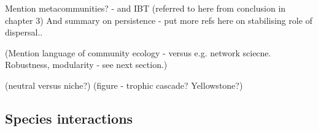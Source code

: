 Mention metacommunities? - and IBT (referred to here from conclusion in chapter 3) And summary on persistence - put more refs here on stabilising role of dispersal..

(Mention language of community ecology - versus e.g. network sciecne. Robustness, modularity - see next section.)

(neutral versus niche?)
(figure - trophic cascade? Yellowstone?)


\subsection{Species interactions}
\label{sec:intro_interactions}

